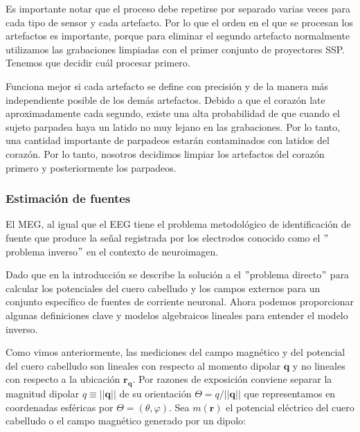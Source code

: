 \documentclass[11pt,letterpaper]{article}
\numberwithin{equation}{subsection}
\numberwithin{table}{subsection}
\begin{document}
\bigskip
\noindent Es importante notar que el proceso debe repetirse por separado varias veces para cada tipo de sensor y cada artefacto. Por lo que el orden en el que se procesan los artefactos es importante, porque para eliminar el segundo artefacto normalmente utilizamos las grabaciones limpiadas con el primer conjunto de proyectores SSP. Tenemos que decidir cuál procesar primero.

\bigskip
\noindent Funciona mejor si cada artefacto se define con precisión y de la manera más independiente posible de los demás artefactos. Debido a que el corazón late aproximadamente cada segundo, existe una alta probabilidad de que cuando el sujeto parpadea haya un latido no muy lejano en las grabaciones. Por lo tanto, una cantidad importante de parpadeos estarán contaminados con latidos del corazón. Por lo tanto, nosotros decidimos limpiar los artefactos del corazón primero y posteriormente los parpadeos. 




\subsubsection{Estimación de fuentes}

\smallskip
\noindent  El MEG, al igual que el EEG tiene el problema metodológico de identificación de fuente que produce la señal registrada por los electrodos conocido como el $"$problema inverso$"$ en el contexto de neuroimagen.

\bigskip
\noindent Dado que en la introducción se describe la solución a el $"$problema directo$"$ para calcular los potenciales del cuero cabelludo y los campos externos para un conjunto específico de fuentes de corriente neuronal. Ahora podemos proporcionar algunas definiciones clave y modelos algebraicos lineales para entender el modelo inverso.

\bigskip
\noindent Como vimos anteriormente, las mediciones del campo magnético y del potencial del cuero cabelludo son lineales con respecto al momento dipolar $\mathbf{q}$ y no lineales con respecto a la ubicación $\mathbf{r}_\mathbf{q}$. Por razones de exposición conviene separar la magnitud dipolar $q \equiv ||\mathbf{q}||$ de su orientación $\Theta = q / ||\mathbf{q}||$ que representamos en coordenadas esféricas por $\Theta = ({\theta,\varphi})$. Sea $m(\mathbf{r})$ el potencial eléctrico del cuero cabelludo o el campo magnético generado por un dipolo:
\end{document}
